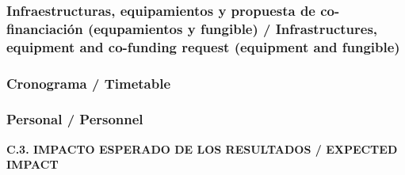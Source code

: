 \documentclass[a4paper,11pt,oneside]{article}
\begin{document}
%
% 
% 
% 
% 

\subsubsection*{Infraestructuras, equipamientos y propuesta de co-financiaci\'on (equpamientos y fungible) / Infrastructures, equipment and co-funding request (equipment and fungible)}

%
%

\subsubsection*{Cronograma / Timetable}

%
%

\subsubsection*{Personal / Personnel}

%

\vspace{12pt}

\noindent\textbf{C.3. IMPACTO ESPERADO DE LOS RESULTADOS / EXPECTED IMPACT}

%
%
%
%
%
\end{document}
